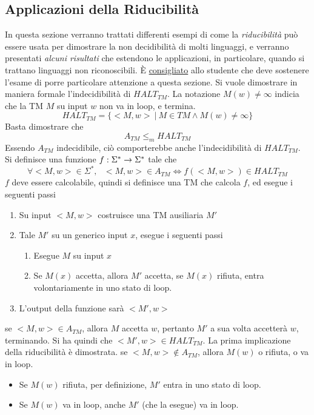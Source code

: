 \documentclass[10pt, letterpaper]{report}
\begin{document}
\subsection{Applicazioni della Riducibilità}
In questa sezione verranno trattati differenti esempi di come la \textit{riducibilità} può essere usata per dimostrare la non decidibilità di molti linguaggi, e verranno presentati \textit{alcuni risultati} che estendono le applicazioni, in particolare, quando si trattano linguaggi non riconoscibili. È \underline{consigliato} allo studente che deve sostenere l'esame di porre particolare attenzione a questa sezione.
Si vuole dimostrare in maniera formale l'indecidibilità di $HALT_{TM}$. La notazione $M(w)\ne\infty$ indicia che la TM $M$ su input $w$ non va in loop, e termina. 
$$ HALT_{TM}=\{<M,w> \ | \ M\in TM\land M(w)\ne\infty \}$$
Basta dimostrare che $$ A_{TM}\le_m HALT_{TM}$$
Essendo $A_{TM}$ indecidibile, ciò comporterebbe anche l'indecidibilità di $HALT_{TM}$. Si definisce una funzione ${f:\Sigma^*\rightarrow \Sigma^*}$ tale che 
$$ \forall <M,w>\in\Sigma^*, \ \ \ <M,w>\in A_{TM}\iff f(<M,w>)\in HALT_{TM}$$
$f$ deve essere calcolabile, quindi si definisce una TM che calcola $f$, ed esegue i seguenti passi 
\begin{enumerate}
    \item Su input $<M,w>$ costruisce una TM ausiliaria $M'$
    \item Tale $M'$ su un generico input $x$, esegue i seguenti passi\begin{enumerate}
        \item Esegue $M$ su input $x$
        \item Se $M(x)$ accetta, allora $M'$ accetta, se $M(x)$ rifiuta, entra volontariamente in uno stato di loop.
    \end{enumerate}
    \item L'output della funzione sarà $<M',w>$
\end{enumerate}
\boxedMath{$\implies$} se $<M,w>\in A_{TM}$, allora $M$ accetta $w$, pertanto $M'$ a sua volta accetterà $w$, terminando. Si ha quindi che $<M',w>\in HALT_{TM}$. La prima implicazione della riducibilità è dimostrata. \acc 
\boxedMath{$\impliedby$} se $<M,w>\notin A_{TM}$, allora $M(w)$ o rifiuta, o va in loop. \begin{itemize}
    \item Se $M(w)$ rifiuta, per definizione, $M'$ entra in uno stato di loop. 
    \item Se $M(w)$ va in loop, anche $M'$ (che la esegue) va in loop.
\end{itemize}
\end{document}
